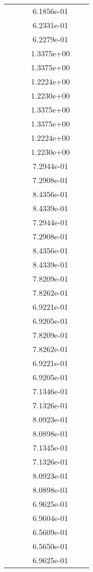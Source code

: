 \begin{xltabular}{\textwidth}{r|rS[table-format=1.3e+2]S[table-format=1.4e+2]S[table-format=1.4e+2]S[table-format=-1.5]}
&  &  & 6.1856e-01 & & \\
&  &  & 6.2331e-01 & & \\
&  &  & 6.2279e-01 & & \\
&  &  & 1.3375e+00 & & \\
&  &  & 1.3375e+00 & & \\
&  &  & 1.2224e+00 & & \\
&  &  & 1.2230e+00 & & \\
&  &  & 1.3375e+00 & & \\
&  &  & 1.3375e+00 & & \\
&  &  & 1.2224e+00 & & \\
&  &  & 1.2230e+00 & & \\
&  &  & 7.2944e-01 & & \\
&  &  & 7.2908e-01 & & \\
&  &  & 8.4356e-01 & & \\
&  &  & 8.4339e-01 & & \\
&  &  & 7.2944e-01 & & \\
&  &  & 7.2908e-01 & & \\
&  &  & 8.4356e-01 & & \\
&  &  & 8.4339e-01 & & \\
&  &  & 7.8209e-01 & & \\
&  &  & 7.8262e-01 & & \\
&  &  & 6.9221e-01 & & \\
&  &  & 6.9205e-01 & & \\
&  &  & 7.8209e-01 & & \\
&  &  & 7.8262e-01 & & \\
&  &  & 6.9221e-01 & & \\
&  &  & 6.9205e-01 & & \\
&  &  & 7.1346e-01 & & \\
&  &  & 7.1326e-01 & & \\
&  &  & 8.0923e-01 & & \\
&  &  & 8.0898e-01 & & \\
&  &  & 7.1345e-01 & & \\
&  &  & 7.1326e-01 & & \\
&  &  & 8.0923e-01 & & \\
&  &  & 8.0898e-01 & & \\
&  &  & 6.9625e-01 & & \\
&  &  & 6.9604e-01 & & \\
&  &  & 6.5609e-01 & & \\
&  &  & 6.5650e-01 & & \\
&  &  & 6.9625e-01 & & \\

\end{xltabular}
